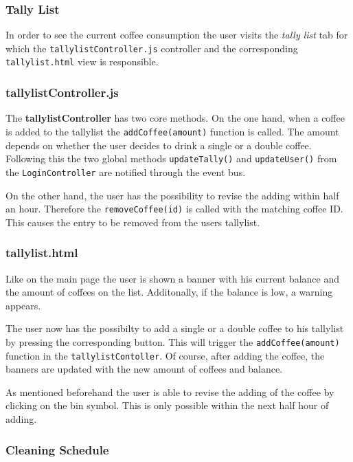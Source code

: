 \subsubsection{Tally List}\label{tally-list}

In order to see the current coffee consumption the user visits the
\emph{tally list} tab for which the \texttt{tallylistController.js}
controller and the corresponding \texttt{tallylist.html} view is
responsible.

\subsubsection*{tallylistController.js}

The \textbf{tallylistController} has two core methods. On the one hand,
when a coffee is added to the tallylist the \texttt{addCoffee(amount)}
function is called. The amount depends on whether the user decides to
drink a single or a double coffee. Following this the two global methods
\texttt{updateTally()} and \texttt{updateUser()} from the
\texttt{LoginController} are notified through the event bus.

On the other hand, the user has the possibility to revise the adding
within half an hour. Therefore the \texttt{removeCoffee(id)} is called
with the matching coffee ID. This causes the entry to be removed from
the users tallylist.

\subsubsection*{tallylist.html}

Like on the main page the user is shown a banner with his current
balance and the amount of coffees on the list. Additonally, if the
balance is low, a warning appears.

The user now has the possibilty to add a single or a double coffee to
his tallylist by pressing the corresponding button. This will trigger
the \texttt{addCoffee(amount)} function in the
\texttt{tallylistContoller}. Of course, after adding the coffee, the
banners are updated with the new amount of coffees and balance.

As mentioned beforehand the user is able to revise the adding of the
coffee by clicking on the bin symbol. This is only possible within the
next half hour of adding.

\subsubsection{Cleaning Schedule}\label{cleaning-schedule}

